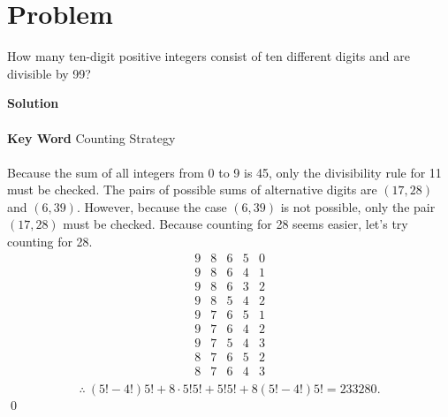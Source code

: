 \documentclass{article}
\newenvironment{solution}{\begin{trivlist}\item[]{\bf Solution}}{\qed \end{trivlist}}
\begin{document}
\section*{Problem}
How many ten-digit positive integers consist of ten different digits and are divisible by 99?
\begin{solution}
\\\\
\textbf{Key Word} Counting Strategy
\\\\
Because the sum of all integers from 0 to 9 is 45, only the divisibility rule for 11 must be checked. The pairs of possible sums of alternative digits are $(17,28)$ and $(6,39)$. However, because the case $(6,39)$ is not possible, only the pair $(17,28)$ must be checked. Because counting for 28 seems easier, let's try counting for 28.
\[
\begin{array}{ccccc}
    9 & 8 & 6 & 5 & 0 \\
    \hline
    9 & 8 & 6 & 4 & 1 \\
    \hline
    9 & 8 & 6 & 3 & 2 \\
    \hline
    9 & 8 & 5 & 4 & 2 \\
    \hline
    9 & 7 & 6 & 5 & 1 \\
    \hline
    9 & 7 & 6 & 4 & 2 \\
    \hline
    9 & 7 & 5 & 4 & 3 \\
    \hline
    8 & 7 & 6 & 5 & 2 \\
    \hline
    8 & 7 & 6 & 4 & 3 \\
\end{array}
\]
\[
\therefore\ (5!-4!)5!+8\cdot5!5!+5!5!+8(5!-4!)5!=\boxed{233280}.
\]
\end{solution}

\newpage
\end{document}
